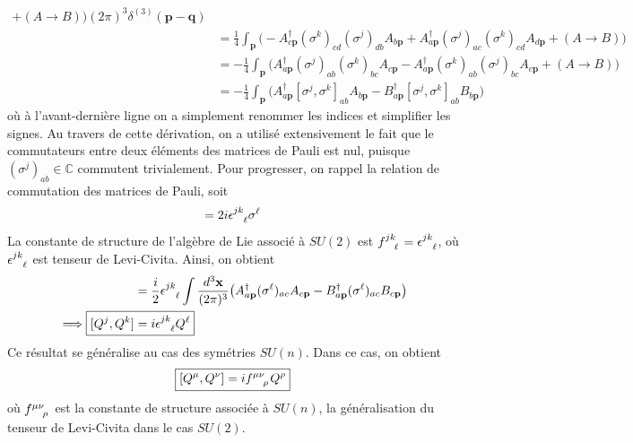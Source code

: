 \documentclass{article}
\numberwithin{equation}{section}
\begin{document}
\begin{align*}
+ (A \rightarrow  B)\big) (2\pi)^{3}\delta^{(3)}(\mathbf{p} - \mathbf{q}) \\
&=  \frac{1}{4}\int_{\mathbf{p}} 
\big( -A^{\dagger}_{c\mathbf{p}}(\sigma^{k})_{cd} (\sigma^{j})_{db} A_{b \mathbf{p}} 
+A^{\dagger}_{a\mathbf{p}}(\sigma^{j})_{ac}(\sigma^{k})_{cd} A_{d \mathbf{p}} 
+ (A \rightarrow  B)\big) \\
&= -\frac{1}{4}\int_{\mathbf{p}} 
\big( A^{\dagger}_{a\mathbf{p}}(\sigma^{j})_{ab} (\sigma^{k})_{bc} A_{c \mathbf{p}} 
-A^{\dagger}_{a\mathbf{p}}(\sigma^{k})_{ab}(\sigma^{j})_{bc} A_{c \mathbf{p}} 
+ (A \rightarrow  B)\big) \\
&= -\frac{1}{4}\int_{\mathbf{p}} 
\big(A^{\dagger}_{a\mathbf{p}}[\sigma^{j}, \sigma^{k}]_{ab} A_{b \mathbf{p}} - B^{\dagger}_{a \mathbf{p}} [\sigma^{j}, \sigma^{k}]_{ab}B_{b \mathbf{p}}\big) 
\end{align*}
\endgroup
où à l'avant-dernière ligne on a simplement renommer les indices et simplifier les signes. Au travers de cette dérivation, on a utilisé extensivement 
le fait que le commutateurs entre deux éléments des matrices de Pauli est nul, puisque $(\sigma^{j})_{ab} \in \mathbb{C}$ commutent trivialement.
Pour  progresser, on rappel la relation de commutation des matrices de Pauli, soit
\begin{equation}
        [\sigma^{j}, \sigma^{k}] = 2i \epsilon\indices{^{jk}_{\ell}} \sigma^{\ell}
\end{equation} 
La constante de structure de l'algèbre de Lie associé à $SU(2)$ est $f\indices{^{jk}_{\ell}} = \epsilon\indices{^{jk}_{\ell}}$, où $\epsilon\indices{^{jk}_{\ell}}$ est tenseur de Levi-Civita. 
Ainsi, on obtient
\begin{align*}
        [Q^{j}, Q^{k}]        
&= \frac{i}{2}\epsilon\indices{^{jk}_{\ell}}\int \frac{d^{3}\mathbf{x}}{(2\pi)^{3}} 
\big( A^{\dagger}_{a\mathbf{p}} (\sigma^{\ell})_{ac} A_{c \mathbf{p}} 
- B^{\dagger}_{a\mathbf{p}} (\sigma^{\ell})_{ac} B_{c \mathbf{p}} 
\big) \\
        \implies \Aboxed{[Q^{j}, Q^{k}] &= i \epsilon\indices{^{jk}_{\ell}}Q^{\ell}}
\end{align*}
Ce résultat se généralise au cas des symétries $SU(n)$. Dans ce cas, on obtient
\begin{equation}
        \boxed{ [Q^{\mu}, Q^{\nu}] = if\indices{^{\mu \nu}_{\rho}}Q^{\rho} }
\end{equation} 
où $f\indices{^{\mu \nu}_{\rho}}$ est la constante de structure associée à $SU(n)$, la généralisation du tenseur de Levi-Civita dans le cas $SU(2)$.
\end{document}
